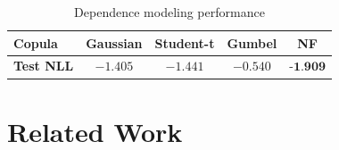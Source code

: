 \documentclass[sigconf, anonymous, review]{acmart}
\begin{document}
\begin{table}[h]
\centering
\caption{Dependence modeling performance}
\label{tab:copula_nll}
\begin{tabular}{lcccc}
\toprule
\textbf{Copula} & Gaussian & Student-t & Gumbel & \textbf{NF} \\
\midrule
\textbf{Test NLL} & $-1.405$ & $-1.441$ & $-0.540$ & $\textbf{-1.909}$ \\
\bottomrule
\end{tabular}
\end{table}

\section{Related Work}


\end{document}
